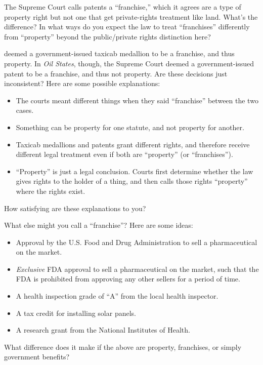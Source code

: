 \item The Supreme Court calls patents a ``franchise,'' which it agrees are a
type of property right but not one that get private-rights treatment like land.
What's the difference? In what ways do you expect the law to treat
``franchises'' differently from ``property'' beyond the public/private rights
distinction here?

\item
{} deemed a government-issued taxicab
medallion to be a franchise, and thus property. In \emph{Oil States}, though,
the Supreme Court deemed a government-issued patent to be a franchise, and thus
not property. Are these decisions just inconsistent? Here are some possible
explanations:
\begin{itemize}
\item The courts meant different things when they said ``franchise'' between the
two cases.
\item Something can be property for one statute, and not property for another.
\item Taxicab medallions and patents grant different rights, and therefore
receive different legal treatment even if both are ``property'' (or
``franchises'').
\item ``Property'' is just a legal conclusion. Courts first determine whether
the law gives rights to the holder of a thing, and then calls those rights
``property'' where the rights exist.
\end{itemize}
How satisfying are these explanations to you?

\item What else might you call a ``franchise''? Here are some ideas:
\begin{itemize}
\item Approval by the U.S. Food and Drug Administration to sell a pharmaceutical
on the market.

\item \emph{Exclusive} FDA approval to sell a pharmaceutical on the market, such
that the FDA is prohibited from approving any other sellers for a period of
time.

\item A health inspection grade of ``A'' from the local health inspector.

\item A tax credit for installing solar panels.

\item A research grant from the National Institutes of Health.
\end{itemize}
What difference does it make if the above are property, franchises, or simply
government benefits?

